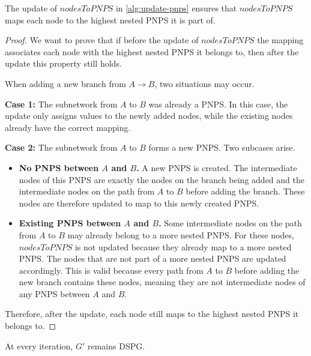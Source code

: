 \begin{theorem}
The update of $nodesToPNPS$ in \cref{alg:update-pnps} ensures that $nodesToPNPS$ maps each node to the highest nested PNPS it is part of.
\end{theorem}
\begin{proof}

We want to prove that if before the update of $nodesToPNPS$ the mapping
associates each node with the highest nested PNPS it belongs to,
then after the update this property still holds.

When adding a new branch from $A \to B$, two situations may occur.

\textbf{Case 1:} The subnetwork from $A$ to $B$ was already a PNPS.
In this case, the update only assigns values to the newly added nodes,
while the existing nodes already have the correct mapping.

\textbf{Case 2:} The subnetwork from $A$ to $B$ forms a new PNPS.
Two subcases arise.

\begin{itemize}

\item \textbf{No PNPS between $A$ and $B$.}  
A new PNPS is created. The intermediate nodes of this PNPS are exactly
the nodes on the branch being added and the intermediate nodes on the
path from $A$ to $B$ before adding the branch. These nodes are therefore
updated to map to this newly created PNPS.

\item \textbf{Existing PNPS between $A$ and $B$.}  
Some intermediate nodes on the path from $A$ to $B$ may already belong
to a more nested PNPS. For these nodes, $nodesToPNPS$ is not updated
because they already map to a more nested PNPS. The nodes that are not
part of a more nested PNPS are updated accordingly. This is valid
because every path from $A$ to $B$ before adding the new branch
contains these nodes, meaning they are not intermediate nodes of any
PNPS between $A$ and $B$.

\end{itemize}

Therefore, after the update, each node still maps to the highest nested
PNPS it belongs to.

\end{proof}

\begin{theorem}
\label{thm:alg-sound}
At every iteration, $G'$ remains \ac{DSPG}.
\end{theorem}

